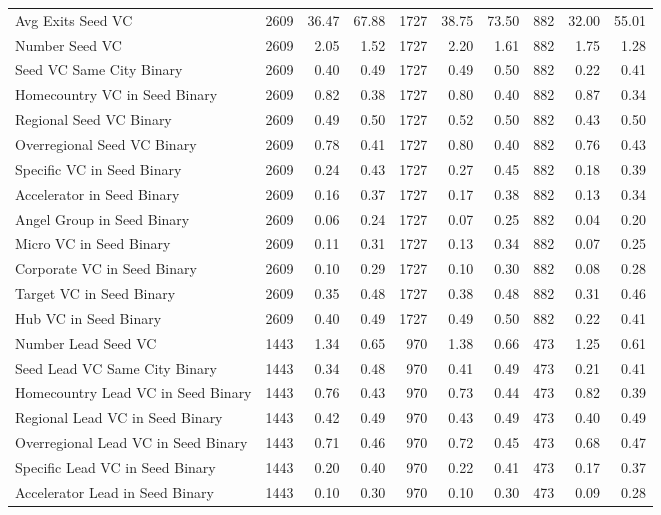 {\begin{table}[!h]
{\begin{tabular}[t]{lrrrrrrrrr}
Avg Exits Seed VC & 2609 & 36.47 & 67.88 & 1727 & 38.75 & 73.50 & 882 & 32.00 & 55.01\\
Number Seed VC & 2609 & 2.05 & 1.52 & 1727 & 2.20 & 1.61 & 882 & 1.75 & 1.28\\
Seed VC Same City Binary & 2609 & 0.40 & 0.49 & 1727 & 0.49 & 0.50 & 882 & 0.22 & 0.41\\
Homecountry VC in Seed Binary & 2609 & 0.82 & 0.38 & 1727 & 0.80 & 0.40 & 882 & 0.87 & 0.34\\
\addlinespace
Regional Seed VC Binary & 2609 & 0.49 & 0.50 & 1727 & 0.52 & 0.50 & 882 & 0.43 & 0.50\\
Overregional Seed VC Binary & 2609 & 0.78 & 0.41 & 1727 & 0.80 & 0.40 & 882 & 0.76 & 0.43\\
Specific VC in Seed Binary & 2609 & 0.24 & 0.43 & 1727 & 0.27 & 0.45 & 882 & 0.18 & 0.39\\
Accelerator in Seed Binary & 2609 & 0.16 & 0.37 & 1727 & 0.17 & 0.38 & 882 & 0.13 & 0.34\\
Angel Group in Seed Binary & 2609 & 0.06 & 0.24 & 1727 & 0.07 & 0.25 & 882 & 0.04 & 0.20\\
\addlinespace
Micro VC in Seed Binary & 2609 & 0.11 & 0.31 & 1727 & 0.13 & 0.34 & 882 & 0.07 & 0.25\\
Corporate VC in Seed Binary & 2609 & 0.10 & 0.29 & 1727 & 0.10 & 0.30 & 882 & 0.08 & 0.28\\
Target VC in Seed Binary & 2609 & 0.35 & 0.48 & 1727 & 0.38 & 0.48 & 882 & 0.31 & 0.46\\
Hub VC in Seed Binary & 2609 & 0.40 & 0.49 & 1727 & 0.49 & 0.50 & 882 & 0.22 & 0.41\\
Number Lead Seed VC & 1443 & 1.34 & 0.65 & 970 & 1.38 & 0.66 & 473 & 1.25 & 0.61\\
\addlinespace
Seed Lead VC Same City Binary & 1443 & 0.34 & 0.48 & 970 & 0.41 & 0.49 & 473 & 0.21 & 0.41\\
Homecountry Lead VC in Seed Binary & 1443 & 0.76 & 0.43 & 970 & 0.73 & 0.44 & 473 & 0.82 & 0.39\\
Regional Lead VC in Seed Binary & 1443 & 0.42 & 0.49 & 970 & 0.43 & 0.49 & 473 & 0.40 & 0.49\\
Overregional Lead VC in Seed Binary & 1443 & 0.71 & 0.46 & 970 & 0.72 & 0.45 & 473 & 0.68 & 0.47\\
Specific Lead VC in Seed Binary & 1443 & 0.20 & 0.40 & 970 & 0.22 & 0.41 & 473 & 0.17 & 0.37\\
\addlinespace
Accelerator Lead in Seed Binary & 1443 & 0.10 & 0.30 & 970 & 0.10 & 0.30 & 473 & 0.09 & 0.28\\

\end{tabular}}
\end{table}}
